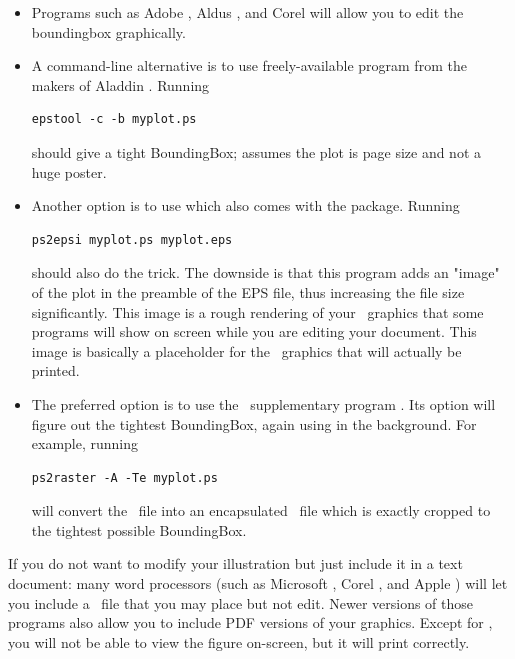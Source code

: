 \begin{itemize}
\item Programs such as Adobe , Aldus
, and Corel  will allow you
to edit the boundingbox graphically.

\item A command-line alternative is to use freely-available program  from the makers of Aladdin .  Running
\small
\begin{verbatim}
epstool -c -b myplot.ps
\end{verbatim}
\normalsize
should give a tight BoundingBox;  assumes the plot
is page size and not a huge poster.

\item Another option is to use  which also comes with the  package.  Running
\small
\begin{verbatim}
ps2epsi myplot.ps myplot.eps
\end{verbatim}
\normalsize
should also do the trick. The downside is that this program adds an "image" of the plot in the preamble of the EPS file, thus increasing the file size significantly. This image is a rough rendering of your \PS\ graphics that some programs will show on screen while you are editing your document. This image is basically a placeholder for the \PS\ graphics that will actually be printed.

\item The preferred option is to use the \GMT\ supplementary program . Its  option will figure out the tightest BoundingBox, again using  in the background. For example, running
\small
\begin{verbatim}
ps2raster -A -Te myplot.ps
\end{verbatim}
\normalsize
will convert the \PS\ file  into an encapsulated \PS\ file  which is exactly cropped to the tightest possible BoundingBox.
\end{itemize}

If you do not want to modify your illustration but just include it in a text document: many word processors (such
as Microsoft , Corel , and Apple )
will let you include a \PS\ file that you may place but not edit. Newer versions of those programs also allow you to include PDF versions of your graphics. Except for , 
you will not be able to view the figure on-screen, but it will print correctly.

